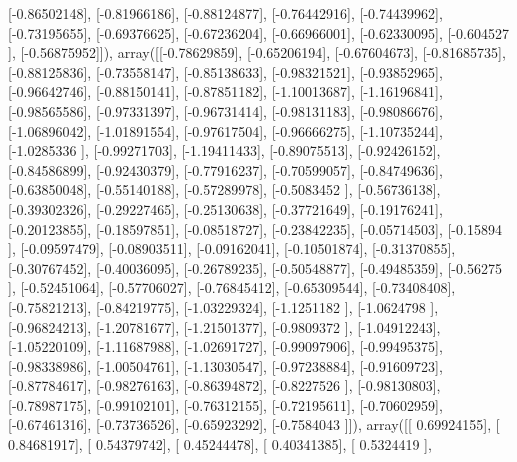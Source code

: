 \documentclass{article}
\begin{document}
       [-0.86502148],
       [-0.81966186],
       [-0.88124877],
       [-0.76442916],
       [-0.74439962],
       [-0.73195655],
       [-0.69376625],
       [-0.67236204],
       [-0.66966001],
       [-0.62330095],
       [-0.604527  ],
       [-0.56875952]]), array([[-0.78629859],
       [-0.65206194],
       [-0.67604673],
       [-0.81685735],
       [-0.88125836],
       [-0.73558147],
       [-0.85138633],
       [-0.98321521],
       [-0.93852965],
       [-0.96642746],
       [-0.88150141],
       [-0.87851182],
       [-1.10013687],
       [-1.16196841],
       [-0.98565586],
       [-0.97331397],
       [-0.96731414],
       [-0.98131183],
       [-0.98086676],
       [-1.06896042],
       [-1.01891554],
       [-0.97617504],
       [-0.96666275],
       [-1.10735244],
       [-1.0285336 ],
       [-0.99271703],
       [-1.19411433],
       [-0.89075513],
       [-0.92426152],
       [-0.84586899],
       [-0.92430379],
       [-0.77916237],
       [-0.70599057],
       [-0.84749636],
       [-0.63850048],
       [-0.55140188],
       [-0.57289978],
       [-0.5083452 ],
       [-0.56736138],
       [-0.39302326],
       [-0.29227465],
       [-0.25130638],
       [-0.37721649],
       [-0.19176241],
       [-0.20123855],
       [-0.18597851],
       [-0.08518727],
       [-0.23842235],
       [-0.05714503],
       [-0.15894   ],
       [-0.09597479],
       [-0.08903511],
       [-0.09162041],
       [-0.10501874],
       [-0.31370855],
       [-0.30767452],
       [-0.40036095],
       [-0.26789235],
       [-0.50548877],
       [-0.49485359],
       [-0.56275   ],
       [-0.52451064],
       [-0.57706027],
       [-0.76845412],
       [-0.65309544],
       [-0.73408408],
       [-0.75821213],
       [-0.84219775],
       [-1.03229324],
       [-1.1251182 ],
       [-1.0624798 ],
       [-0.96824213],
       [-1.20781677],
       [-1.21501377],
       [-0.9809372 ],
       [-1.04912243],
       [-1.05220109],
       [-1.11687988],
       [-1.02691727],
       [-0.99097906],
       [-0.99495375],
       [-0.98338986],
       [-1.00504761],
       [-1.13030547],
       [-0.97238884],
       [-0.91609723],
       [-0.87784617],
       [-0.98276163],
       [-0.86394872],
       [-0.8227526 ],
       [-0.98130803],
       [-0.78987175],
       [-0.99102101],
       [-0.76312155],
       [-0.72195611],
       [-0.70602959],
       [-0.67461316],
       [-0.73736526],
       [-0.65923292],
       [-0.7584043 ]]), array([[ 0.69924155],
       [ 0.84681917],
       [ 0.54379742],
       [ 0.45244478],
       [ 0.40341385],
       [ 0.5324419 ],
\end{document}
